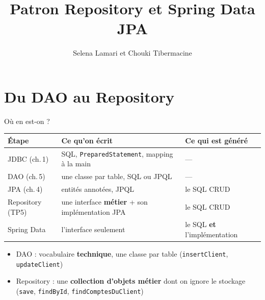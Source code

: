\documentclass[aspectratio=169,10pt]{beamer}
\title{Patron Repository et Spring Data JPA}
\author[C. Tibermacine]{Selena Lamari et Chouki Tibermacine}
\date{}
\begin{document}

\section{Du DAO au Repository}

\begin{frame}{O\`u en est-on ?}
  \begin{datacard}
    \small
    \begin{tabular}{@{}lp{5.2cm}p{5.2cm}@{}}
      \toprule
      \textbf{\'Etape} & \textbf{Ce qu'on \'ecrit} & \textbf{Ce qui est g\'en\'er\'e} \\
      \midrule
      JDBC (ch.\,1) & SQL, \texttt{PreparedStatement}, mapping \`a la main & --- \\
      DAO (ch.\,5) & une classe par table, SQL ou JPQL & --- \\
      JPA (ch.\,4) & entit\'es annot\'ees, JPQL & le SQL CRUD \\
      Repository (TP5) & une interface \textbf{m\'etier} + son impl\'ementation JPA & le SQL CRUD \\
      \alert{Spring Data} & \alert{l'interface seulement} & le SQL \textbf{et} l'impl\'ementation \\
      \bottomrule
    \end{tabular}
  \end{datacard}
  \vspace{2mm}
  \begin{itemize}
    \item DAO : vocabulaire \textbf{technique}, une classe par table (\texttt{insertClient}, \texttt{updateClient})
    \item Repository : une \textbf{collection d'objets m\'etier} dont on ignore le stockage (\texttt{save}, \texttt{findById}, \texttt{findComptesDuClient})
  \end{itemize}
\end{frame}
\end{document}
